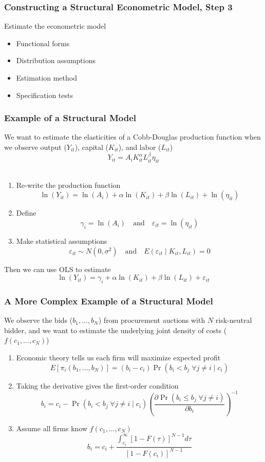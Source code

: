 \documentclass{beamer}\usepackage[]{graphicx}\usepackage[]{color}
\begin{document}
\begin{frame}\frametitle{Constructing a Structural Econometric Model, Step 3}
    Estimate the econometric model
    \begin{itemize}
        \item Functional forms
        \item Distribution assumptions
        \item Estimation method
        \item Specification tests
    \end{itemize}
\end{frame}

\begin{frame}\frametitle{Example of a Structural Model}
    We want to estimate the elasticities of a Cobb-Douglas production function when we observe output ($Y_{it}$), capital ($K_{it}$), and labor ($L_{it}$)
    $$Y_{it} = A_i K_{it}^\alpha L_{it}^\beta \eta_{it}$$ \\
    \begin{enumerate}
        \item Re-write the production function
        $$\ln(Y_{it}) = \ln(A_i) + \alpha \ln(K_{it}) + \beta \ln(L_{it}) + \ln(\eta_{it})$$
        \item Define
        $$\gamma_i = \ln(A_i) \quad \text{and} \quad \varepsilon_{it} = \ln(\eta_{it})$$
        \item Make statistical assumptions
        $$\varepsilon_{it} \sim N(0, \sigma^2) \quad \text{and} \quad E(\varepsilon_{it} \mid K_{it}, L_{it}) = 0$$
    \end{enumerate}
    Then we can use OLS to estimate
    $$\ln(Y_{it}) = \gamma_i + \alpha \ln(K_{it}) + \beta \ln(L_{it}) + \varepsilon_{it}$$
\end{frame}

\begin{frame}\frametitle{A More Complex Example of a Structural Model}
    We observe the bids ($b_1, \ldots, b_N$) from procurement auctions with $N$ risk-neutral bidder, and we want to estimate the underlying joint density of costs ($f(c_1, \ldots, c_N)$)
    \begin{enumerate}
        \item Economic theory tells us each firm will maximize expected profit
        $$E[\pi_i(b_1, \ldots, b_N)] = (b_i - c_i) \Pr(b_i < b_j \; \forall j \neq i \mid c_i)$$
        \item Taking the derivative gives the first-order condition
        $$b_i = c_i - \Pr(b_i < b_j \; \forall j \neq i \mid c_i) \left( \frac{\partial \Pr(b_i \leq b_j \; \forall j \neq i)}{\partial b_i} \right)^{-1}$$
        \item Assume all firms know $f(c_1, \ldots, c_N)$
        $$b_i = c_i + \frac{\int_{c_i}^\infty [1 - F(\tau)]^{N - 1} d\tau}{[1 - F(c_i)]^{N - 1}}$$
    \end{enumerate}
\end{frame}
\end{document}
